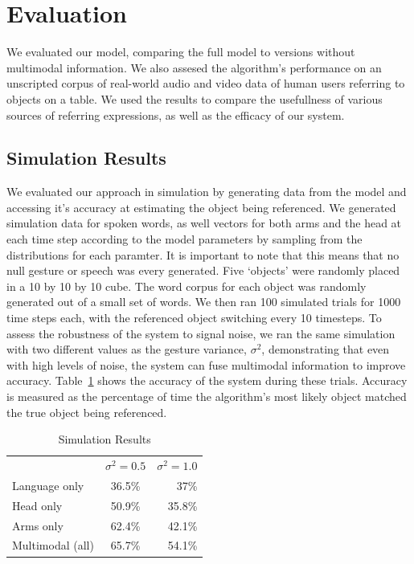 \documentclass[a4paper, 11pt]{article} %
\begin{document}
\section{Evaluation}
We evaluated our model, comparing the full model to versions without multimodal information. We also assesed the algorithm's performance on an unscripted corpus of real-world audio and video data of human users referring to objects on a table. We used the results to compare the usefullness of various sources of referring expressions, as well as the efficacy of our system.
\subsection{Simulation Results}
We evaluated our approach in simulation by generating data from the model and accessing it's accuracy at estimating the object being referenced. We generated simulation data for spoken words, as well vectors for both arms and the head at each time step according to the model parameters by sampling from the distributions for each paramter. It is important to note that this means that no null gesture or speech was every generated. Five `objects' were randomly placed in a 10 by 10 by 10 cube. The word corpus for each object was randomly generated out of a small set of words. We then ran 100 simulated trials for 1000 time steps each, with the referenced object switching every 10 timesteps. To assess the robustness of the system to signal noise, we ran the same simulation with two different values as the gesture variance, $\sigma^2$, demonstrating that even with high levels of noise, the system can fuse multimodal information to improve accuracy. Table~\ref{table:sim_results} shows the accuracy of the system during these trials. Accuracy is measured as the percentage of time the algorithm's most likely object matched the true object being referenced.
\begin{table}[h]
\centering
\caption{Simulation Results\label{table:sim_results}}
\begin{tabular}{lcr}
\toprule
& $\sigma^2 = 0.5$ & $\sigma^2 = 1.0$\\
Language only &  36.5\% & 37\%\\
Head only & 50.9\% & 35.8\%\\
Arms only & 62.4\% & 42.1\%\\
Multimodal (all)&  65.7\% & 54.1\%\\
\bottomrule
\end{tabular}
\end{table}
\end{document}
